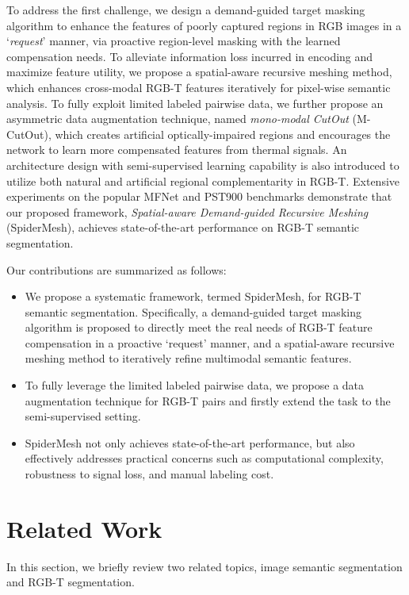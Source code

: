 \documentclass[letterpaper, 10 pt, conference]{ieeeconf}
\begin{document}
To address the first challenge, we design a demand-guided target masking algorithm to enhance the features of poorly captured regions in RGB images in a `\textit{request}' manner, via proactive region-level masking with the learned compensation needs. To alleviate information loss incurred in encoding and maximize feature utility, we propose a spatial-aware recursive meshing method, which enhances cross-modal RGB-T features iteratively for pixel-wise semantic analysis. To fully exploit limited labeled pairwise data, we further propose an asymmetric data augmentation technique, named \textit{mono-modal CutOut} (M-CutOut), which creates artificial optically-impaired regions and encourages the network to learn more compensated features from thermal signals. An architecture design with semi-supervised learning capability is also introduced to utilize both natural and artificial regional complementarity in RGB-T. Extensive experiments on the popular MFNet and PST900 benchmarks demonstrate that our proposed framework, \textit{Spatial-aware Demand-guided Recursive Meshing} (SpiderMesh), achieves state-of-the-art performance on RGB-T semantic segmentation.

Our contributions are summarized as follows:
\begin{itemize}
  \setlength{\itemsep}{0pt}
  \setlength{\parsep}{0pt}
  \setlength{\parskip}{0pt}
  \item We propose a systematic framework, termed SpiderMesh, for RGB-T semantic segmentation. Specifically, a demand-guided target masking algorithm is proposed to directly meet the real needs of RGB-T feature compensation in a proactive `request’ manner, and a spatial-aware recursive meshing method to iteratively refine multimodal semantic features.
  \item To fully leverage the limited labeled pairwise data, we propose a data augmentation technique for RGB-T pairs and firstly extend the task to the semi-supervised setting.
  \item SpiderMesh not only achieves state-of-the-art performance, but also effectively addresses practical concerns such as computational complexity, robustness to signal loss, and manual labeling cost. 
\end{itemize}


\section{Related Work}

In this section, we briefly review two related topics, image semantic segmentation and RGB-T segmentation.
\end{document}
